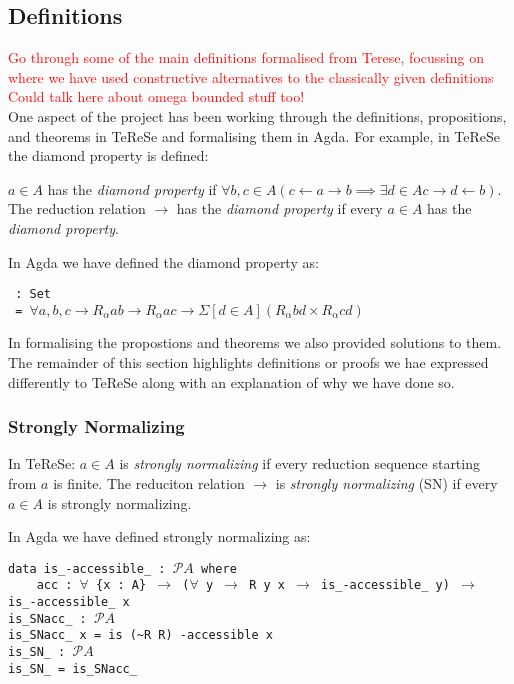 \documentclass{scrartcl}
\begin{document}
\subsection{Definitions}
\textcolor{red}{Go through some of the main definitions formalised from Terese, focussing on where we have used constructive alternatives to the classically given definitions
Could talk here about omega bounded stuff too!}
\\
One aspect of the project has been working through the definitions, propositions, and theorems in TeReSe and formalising them in Agda. 
For example, in TeReSe the diamond property is defined:
\begin{center}
    $a \in A$ has the \textit{diamond property} if $\forall b, c \in A (c \leftarrow a \rightarrow b \implies \exists d \in A c \rightarrow d \leftarrow b)$. The reduction relation $\rightarrow$ has the \textit{diamond property} if every $a \in A$ has the \textit{diamond property}.
\end{center}
In Agda we have defined the diamond property as:
\begin{flushleft}
    \texttt{ : Set}\\
    \texttt{ = $\forall a, b, c \rightarrow R_{\alpha} a b \rightarrow R_{\alpha} a c \rightarrow \Sigma[ d \in A ] (R_{\alpha} b d \times R_{\alpha} c d)$}
\end{flushleft}
In formalising the propostions and theorems we also provided solutions to them. \\
The remainder of this section highlights definitions or proofs we hae expressed differently to TeReSe along with an explanation of why we have done so.

\subsubsection{Strongly Normalizing}
\begin{center}
    In TeReSe: $a \in A$ is \textit{strongly normalizing} if every reduction sequence starting from $a$ is finite. The reduciton relation $\rightarrow$ is \textit{strongly normalizing} (SN) if every $a \in A$ is strongly normalizing. 
\end{center}
In Agda we have defined strongly normalizing as:

\begin{flushleft}
    \texttt{data is\_-accessible\_ : $\mathscr{P} A$ where}\\
    \texttt{\ \ \ \ acc : $\forall$ \{x : A\} $\rightarrow$ ($\forall$ y $\rightarrow$ R y x $\rightarrow$ is\_-accessible\_ y) $\rightarrow$ \quad is\_-accessible\_ x}\\
    \texttt{is\_SNacc\_ : $\mathscr{P} A$}\\
    \texttt{is\_SNacc\_ x = is (\textasciitilde R R) -accessible x}\\
    \texttt{is\_SN\_ : $\mathscr{P} A$}\\
    \texttt{is\_SN\_ = is\_SNacc\_}
\end{flushleft}
\end{document}
